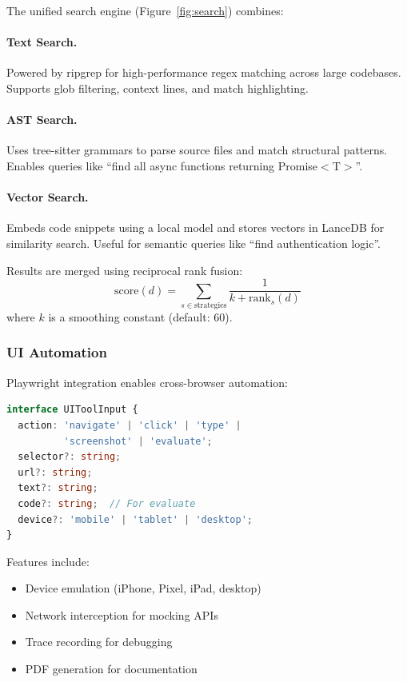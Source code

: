 The unified search engine (Figure~\ref{fig:search}) combines:

\paragraph{Text Search.} Powered by ripgrep for high-performance regex matching across large codebases. Supports glob filtering, context lines, and match highlighting.

\paragraph{AST Search.} Uses tree-sitter grammars to parse source files and match structural patterns. Enables queries like ``find all async functions returning Promise$<$T$>$''.

\paragraph{Vector Search.} Embeds code snippets using a local model and stores vectors in LanceDB for similarity search. Useful for semantic queries like ``find authentication logic''.

Results are merged using reciprocal rank fusion:
\begin{equation}
    \text{score}(d) = \sum_{s \in \text{strategies}} \frac{1}{k + \text{rank}_s(d)}
\end{equation}
where $k$ is a smoothing constant (default: 60).

\subsubsection{UI Automation}

Playwright integration enables cross-browser automation:

\begin{lstlisting}[language=TypeScript]
interface UIToolInput {
  action: 'navigate' | 'click' | 'type' |
          'screenshot' | 'evaluate';
  selector?: string;
  url?: string;
  text?: string;
  code?: string;  // For evaluate
  device?: 'mobile' | 'tablet' | 'desktop';
}
\end{lstlisting}

Features include:
\begin{itemize}
    \item Device emulation (iPhone, Pixel, iPad, desktop)
    \item Network interception for mocking APIs
    \item Trace recording for debugging
    \item PDF generation for documentation
\end{itemize}

